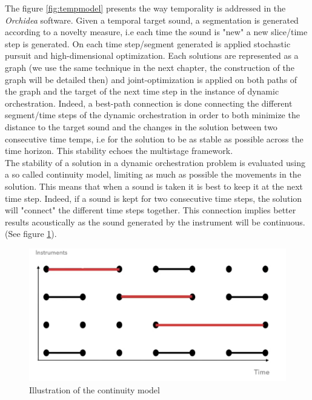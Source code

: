 \documentclass[a4paper]{book}
\begin{document}
The figure \ref{fig:tempmodel} presents the way temporality is addressed in the \textit{Orchidea} software.
Given a temporal target sound, a segmentation is generated according to a novelty measure, i.e each time the sound is "new" a new slice/time step is generated. On each time step/segment generated is applied stochastic pursuit and high-dimensional optimization. Each solutions are represented as a graph (we use the same technique in the next chapter, the construction of the graph will be detailed then) and joint-optimization is applied on both paths of the graph and the target of the next time step in the instance of dynamic orchestration. Indeed, a best-path connection is done connecting the different segment/time steps of the dynamic orchestration in order to both minimize the distance to the target sound and the changes in the solution between two consecutive time temps, i.e for the solution to be as stable as possible across the time horizon. This stability echoes the multistage framework.\\

The stability of a solution in a dynamic orchestration problem is evaluated using a so called continuity model, limiting as much as possible the movements in the solution. This means that when a sound is taken it is best to keep it at the next time step. Indeed, if a sound is kept for two consecutive time steps, the solution will "connect" the different time steps together. This connection implies better results acoustically as the sound generated by the instrument will be continuous. (See figure \ref{fig:contmodel}).

\begin{figure}[ht!]
    \centering
    \includegraphics[scale=0.35]{contmodel.png}
    \caption{Illustration of the continuity model}
    \label{fig:contmodel}
\end{figure}
\end{document}
